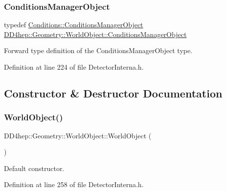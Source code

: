 \subsubsection{\texorpdfstring{Conditions\+Manager\+Object}{ConditionsManagerObject}}
{\footnotesize\ttfamily typedef \hyperlink{class_d_d4hep_1_1_conditions_1_1_conditions_manager_object}{Conditions\+::\+Conditions\+Manager\+Object} \hyperlink{class_d_d4hep_1_1_geometry_1_1_world_object_a96576e6e392fe72924c1135cc8907aec}{D\+D4hep\+::\+Geometry\+::\+World\+Object\+::\+Conditions\+Manager\+Object}}



Forward type definition of the Conditions\+Manager\+Object type. 



Definition at line 224 of file Detector\+Interna.\+h.



\subsection{Constructor \& Destructor Documentation}
\hypertarget{class_d_d4hep_1_1_geometry_1_1_world_object_a69331daf3614dc0e3a5f7ff37164c8ef}{}\label{class_d_d4hep_1_1_geometry_1_1_world_object_a69331daf3614dc0e3a5f7ff37164c8ef} 
\subsubsection{\texorpdfstring{World\+Object()}{WorldObject()}\hspace{0.1cm}{\footnotesize\ttfamily [1/2]}}
{\footnotesize\ttfamily D\+D4hep\+::\+Geometry\+::\+World\+Object\+::\+World\+Object (\begin{DoxyParamCaption}{ }\end{DoxyParamCaption})\hspace{0.3cm}{\ttfamily [inline]}}



Default constructor. 



Definition at line 258 of file Detector\+Interna.\+h.

\hypertarget{class_d_d4hep_1_1_geometry_1_1_world_object_a2cdaba10494eab66ef9c4a5cd9152f31}{}\label{class_d_d4hep_1_1_geometry_1_1_world_object_a2cdaba10494eab66ef9c4a5cd9152f31} 
